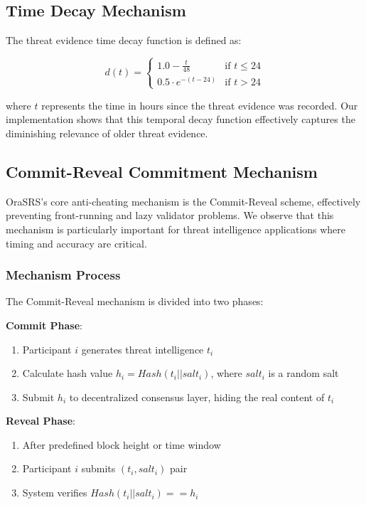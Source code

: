 \documentclass[12pt]{article}
\begin{document}
\subsection{Time Decay Mechanism}

The threat evidence time decay function is defined as:

\begin{equation}
\label{eq:time_decay}
d(t) = 
\begin{cases} 
1.0 - \frac{t}{48} & \text{if } t \leq 24 \\
0.5 \cdot e^{-(t - 24)} & \text{if } t > 24
\end{cases}
\end{equation}

where $t$ represents the time in hours since the threat evidence was recorded. Our implementation shows that this temporal decay function effectively captures the diminishing relevance of older threat evidence.

\subsection{Commit-Reveal Commitment Mechanism}

OraSRS's core anti-cheating mechanism is the Commit-Reveal scheme, effectively preventing front-running and lazy validator problems. We observe that this mechanism is particularly important for threat intelligence applications where timing and accuracy are critical.

\subsubsection{Mechanism Process}
The Commit-Reveal mechanism is divided into two phases:

\textbf{Commit Phase}:
\begin{enumerate}
\item Participant $i$ generates threat intelligence $t_i$
\item Calculate hash value $h_i = Hash(t_i || salt_i)$, where $salt_i$ is a random salt
\item Submit $h_i$ to decentralized consensus layer, hiding the real content of $t_i$
\end{enumerate}

\textbf{Reveal Phase}:
\begin{enumerate}
\item After predefined block height or time window
\item Participant $i$ submits $(t_i, salt_i)$ pair
\item System verifies $Hash(t_i || salt_i) == h_i$
\end{enumerate}
\end{document}
